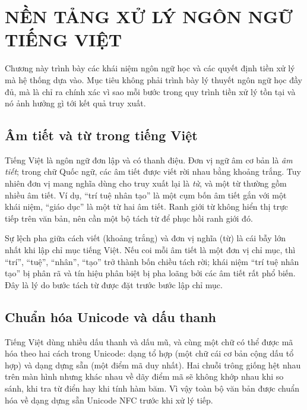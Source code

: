\chapter{NỀN TẢNG XỬ LÝ NGÔN NGỮ TIẾNG VIỆT}
\label{ch:ch2-nlp}

Chương này trình bày các khái niệm ngôn ngữ học và các quyết định tiền xử lý mà
hệ thống dựa vào. Mục tiêu không phải trình bày lý thuyết ngôn ngữ học đầy đủ, mà
là chỉ ra chính xác vì sao mỗi bước trong quy trình tiền xử lý tồn tại và nó ảnh
hưởng gì tới kết quả truy xuất.

\section{Âm tiết và từ trong tiếng Việt}

Tiếng Việt là ngôn ngữ đơn lập và có thanh điệu. Đơn vị ngữ âm cơ bản là
\emph{âm tiết}; trong chữ Quốc ngữ, các âm tiết được viết rời nhau bằng khoảng
trắng. Tuy nhiên đơn vị mang nghĩa dùng cho truy xuất lại là \emph{từ}, và một từ
thường gồm nhiều âm tiết. Ví dụ, ``trí tuệ nhân tạo'' là một cụm bốn âm tiết gắn
với một khái niệm, ``giáo dục'' là một từ hai âm tiết. Ranh giới từ không hiển
thị trực tiếp trên văn bản, nên cần một bộ tách từ để phục hồi ranh giới đó.

Sự lệch pha giữa cách viết (khoảng trắng) và đơn vị nghĩa (từ) là cái bẫy lớn
nhất khi lập chỉ mục tiếng Việt. Nếu coi mỗi âm tiết là một đơn vị chỉ mục, thì
``trí'', ``tuệ'', ``nhân'', ``tạo'' trở thành bốn chiều tách rời; khái niệm
``trí tuệ nhân tạo'' bị phân rã và tín hiệu phân biệt bị pha loãng bởi các âm tiết
rất phổ biến. Đây là lý do bước tách từ được đặt trước bước lập chỉ mục.

\section{Chuẩn hóa Unicode và dấu thanh}

Tiếng Việt dùng nhiều dấu thanh và dấu mũ, và cùng một chữ có thể được mã hóa theo
hai cách trong Unicode: dạng tổ hợp (một chữ cái cơ bản cộng dấu tổ hợp) và dạng
dựng sẵn (một điểm mã duy nhất). Hai chuỗi trông giống hệt nhau trên màn hình
nhưng khác nhau về dãy điểm mã sẽ không khớp nhau khi so sánh, khi tra từ điển
hay khi tính hàm băm. Vì vậy toàn bộ văn bản được chuẩn hóa về dạng dựng sẵn
Unicode NFC trước khi xử lý tiếp.


